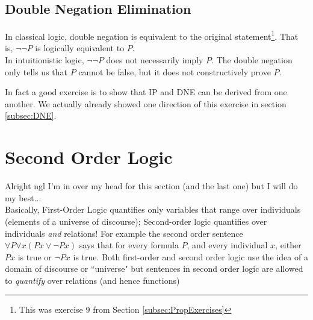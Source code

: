 \subsection{Double Negation Elimination}
In classical logic, double negation is equivalent to the original statement\footnote{This was exercise 9 from Section \ref{subsec:PropExercises}}. That is, $\neg \neg P$ is logically equivalent to $P$. \\

\noindent In intuitionistic logic, $\neg \neg P$ does not necessarily imply $P$. The double negation only tells us that 
$P$ cannot be false, but it does not constructively prove $P$.

In fact a good exercise is to show that IP and DNE can be derived from one another. We actually already showed one direction of this exercise in section \ref{subsec:DNE}.

\section{Second Order Logic}
Alright ngl I'm in over my head for this section (and the last one) but I will do my best... \\

Basically, First-Order Logic quantifies only variables that range over individuals (elements of a universe of discourse); Second-order logic quantifies over individuals \textit{and} relations! For example the second order sentence $\forall P \forall x (Px\lor \neg Px)$ says that for every formula $P$, and every individual $x$, either $Px$ is true or $\neg Px$ is true. Both first-order and second order logic use the idea of a domain of discourse or ``universe" but sentences in second order logic are allowed to \textit{quantify} over relations (and hence functions)

